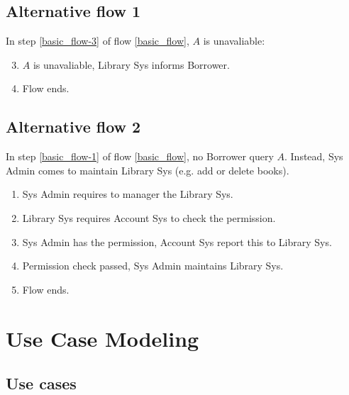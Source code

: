 \documentclass{article}
\begin{document}
    \subsection{Alternative flow 1}
    In step \ref{basic_flow-3} of flow \ref{basic_flow}, $A$ is unavaliable:

    \begin{enumerate}
        \setcounter{enumi}{2}
        \item $A$ is unavaliable, Library Sys informs Borrower.
        \item Flow ends.
    \end{enumerate}

    \subsection{Alternative flow 2}

    In step \ref{basic_flow-1} of flow \ref{basic_flow}, no Borrower query $A$.
    Instead, Sys Admin comes to maintain Library Sys (e.g. add or delete books).

    \begin{enumerate}
        \item Sys Admin requires to manager the Library Sys.
        \item Library Sys requires Account Sys to check the permission.
        \item Sys Admin has the permission, Account Sys report this to Library Sys.
        \item Permission check passed, Sys Admin maintains Library Sys.
        \item Flow ends.
    \end{enumerate}

    \section{Use Case Modeling}
    \subsection{Use cases}
\end{document}
